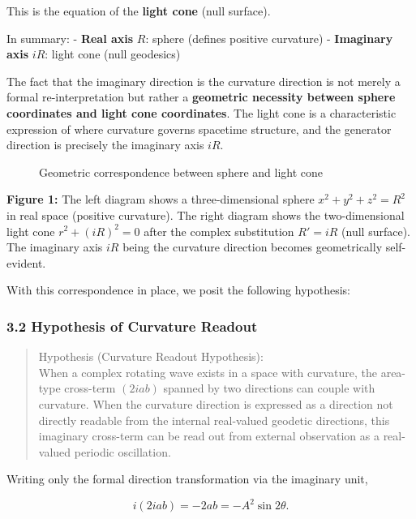 \documentclass[
  a4paper,
]{article}
\makeatletter
\newcommand*\pandocbounded[1]{%
  \sbox\pandoc@box{#1}%
  \Gscale@div\@tempa{\textheight}{\dimexpr\ht\pandoc@box+\dp\pandoc@box\relax}%
  \Gscale@div\@tempb{\linewidth}{\wd\pandoc@box}%
  \ifdim\@tempb\p@<\@tempa\p@\let\@tempa\@tempb\fi%
  \ifdim\@tempa\p@<\p@\scalebox{\@tempa}{\usebox\pandoc@box}%
  \else\usebox{\pandoc@box}%
  \fi%
}
\makeatother
\begin{document}
This is the equation of the \textbf{light cone} (null surface).

In summary: - \textbf{Real axis} \(R\): sphere (defines positive
curvature) - \textbf{Imaginary axis} \(iR\): light cone (null geodesics)

The fact that the imaginary direction is the curvature direction is not
merely a formal re-interpretation but rather a \textbf{geometric
necessity between sphere coordinates and light cone coordinates}. The
light cone is a characteristic expression of where curvature governs
spacetime structure, and the generator direction is precisely the
imaginary axis \(iR\).

\begin{figure}
\centering
\pandocbounded{}
\caption{Geometric correspondence between sphere and light cone}
\end{figure}

\textbf{Figure 1:} The left diagram shows a three-dimensional sphere
\(x^2 + y^2 + z^2 = R^2\) in real space (positive curvature). The right
diagram shows the two-dimensional light cone \(r^2 + (iR)^2 = 0\) after
the complex substitution \(R' = iR\) (null surface). The imaginary axis
\(iR\) being the curvature direction becomes geometrically self-evident.

With this correspondence in place, we posit the following hypothesis:

\subsubsection{3.2 Hypothesis of Curvature
Readout}\label{hypothesis-of-curvature-readout-1}

\begin{quote}
Hypothesis (Curvature Readout Hypothesis):\\
When a complex rotating wave exists in a space with curvature, the
area-type cross-term \((2iab)\) spanned by two directions can couple
with curvature. When the curvature direction is expressed as a direction
not directly readable from the internal real-valued geodetic directions,
this imaginary cross-term can be read out from external observation as a
real-valued periodic oscillation.
\end{quote}

Writing only the formal direction transformation via the imaginary unit,

\[i(2iab)=-2ab=-A^2\sin2\theta. \tag{5}\]
\end{document}
